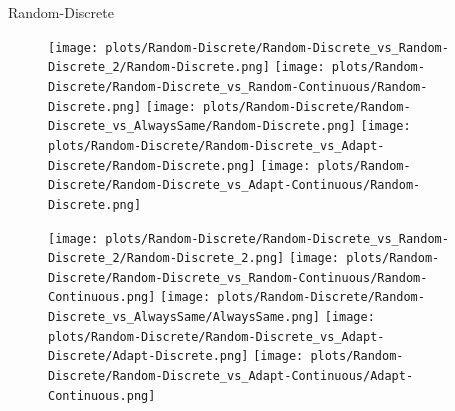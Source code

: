 \documentclass{article}
\begin{document}
Random-Discrete\\
\begin{figure}[!h]
	\centering
	\begin{minipage}[c]{0.1\textwidth}
		\raggedleft
	\end{minipage}
	\begin{minipage}[c]{0.80\textwidth}
		\hfill
		\hfill
		\hfill
		\hfill
		\hfill
	\end{minipage}
\end{figure}
\begin{figure}[!h]
	\centering
	\begin{minipage}[c]{0.1\textwidth}
		\raggedleft
	\end{minipage}
	\begin{minipage}[c]{0.80\textwidth}
		\texttt{[image: plots/Random-Discrete/Random-Discrete\_vs\_Random-Discrete\_2/Random-Discrete.png]}\hfill
		\texttt{[image: plots/Random-Discrete/Random-Discrete\_vs\_Random-Continuous/Random-Discrete.png]}\hfill
		\texttt{[image: plots/Random-Discrete/Random-Discrete\_vs\_AlwaysSame/Random-Discrete.png]}\hfill
		\texttt{[image: plots/Random-Discrete/Random-Discrete\_vs\_Adapt-Discrete/Random-Discrete.png]}\hfill
		\texttt{[image: plots/Random-Discrete/Random-Discrete\_vs\_Adapt-Continuous/Random-Discrete.png]}\hfill
	\end{minipage}
\end{figure}
\begin{figure}[!h]
	\centering
	\begin{minipage}[c]{0.1\textwidth}
		\raggedleft
	\end{minipage}
	\begin{minipage}[c]{0.80\textwidth}
		\texttt{[image: plots/Random-Discrete/Random-Discrete\_vs\_Random-Discrete\_2/Random-Discrete\_2.png]}\hfill
		\texttt{[image: plots/Random-Discrete/Random-Discrete\_vs\_Random-Continuous/Random-Continuous.png]}\hfill
		\texttt{[image: plots/Random-Discrete/Random-Discrete\_vs\_AlwaysSame/AlwaysSame.png]}\hfill
		\texttt{[image: plots/Random-Discrete/Random-Discrete\_vs\_Adapt-Discrete/Adapt-Discrete.png]}\hfill
		\texttt{[image: plots/Random-Discrete/Random-Discrete\_vs\_Adapt-Continuous/Adapt-Continuous.png]}\hfill
\end{minipage}
\end{figure}
\end{document}
